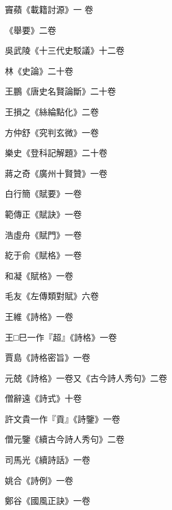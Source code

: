 \begin{pinyinscope}
 竇蘋《載籍討源》一
 卷



 《舉要》二卷



 吳武陵《十三代史駁議》十二卷



 林《史論》二十卷



 王鵬《唐史名賢論斷》二十卷



 王損之《絲綸點化》二卷



 方仲舒《究判玄微》一卷



 樂史《登科記解題》二十卷



 蔣之奇《廣州十賢贊》一卷



 白行簡《賦要》一卷



 範傳正《賦訣》一卷



 浩虛舟《賦門》一卷



 紇于俞《賦格》一卷



 和凝《賦格》一卷



 毛友《左傳類對賦》六卷



 王維《詩格》一卷



 王□巳一作『超』《詩格》一卷



 賈島《詩格密旨》一卷



 元兢《詩格》一卷又《古今詩人秀句》二卷



 僧辭遠《詩式》十卷



 許文貴一作『貢』《詩鑒》一卷



 僧元鑒《續古今詩人秀句》二卷



 司馬光《續詩話》一卷



 姚合《詩例》一卷



 鄭谷《國風正訣》一卷




\end{pinyinscope}
